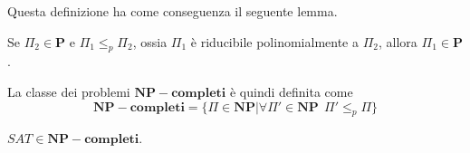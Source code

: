 Questa definizione ha come conseguenza il seguente lemma.
\begin{lemma}\label{lem:poli_red}
	Se $\Pi_2 \in \mathbf{P}$ e $ \Pi_1 \leq_{p} \Pi_2$,
	ossia $\Pi_1$ è riducibile polinomialmente a $\Pi_2$, allora $\Pi_1 \in \mathbf{P}$.
\end{lemma}
La classe dei problemi $\mathbf{NP-completi}$ è quindi definita come
$$
	\mathbf{NP-completi} = \{\Pi \in \mathbf{NP} | \forall \Pi'\in \mathbf{NP} ~~ \Pi' \leq_{p} \Pi\}
$$
\begin{theorem}[di Cook]
	$SAT \in \mathbf{NP-completi}$.
\end{theorem}


